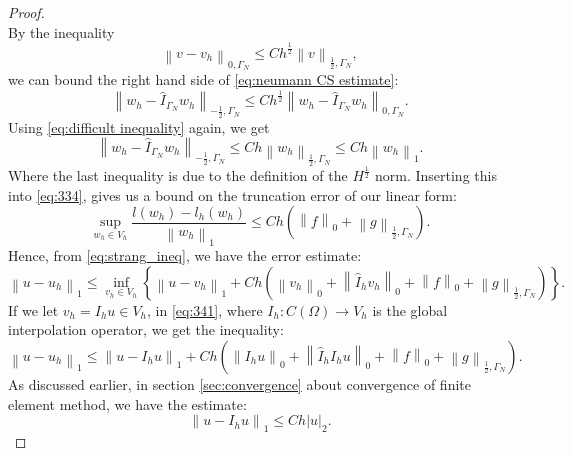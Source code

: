 \documentclass[../Main/main.tex]{subfiles}
\begin{document}
\begin{proof}
\begin{equation}
		\end{equation}
		By the inequality
		\begin{equation}\label{eq:difficult inequality}
			\left \| v-v_h\right \|_{0,\Gamma_N} \leq C h^{\frac{1}{2}} \left \| v \right \|_{\frac{1}{2}, \Gamma_N},
		\end{equation}
		we can bound the right hand side of  \eqref{eq:neumann CS estimate}: 
		\begin{equation}
				\left \|w_h-\hat{I}_{\Gamma_N} w_h\right \|_{-\frac{1}{2},\Gamma_N} \leq Ch^{\frac{1}{2}} \left \| w_h-\hat{I}_{\Gamma_N} w_h \right \|_{0,\Gamma_N}.
		\end{equation}
		Using \eqref{eq:difficult inequality} again, we get
		\begin{equation}
				\left \|w_h-\hat{I}_{\Gamma_N} w_h\right \|_{-\frac{1}{2},\Gamma_N} \leq Ch \left \|w_h\right \|_{\frac{1}{2},\Gamma_N} \leq Ch\left \| w_h \right \|_1.
		\end{equation}
		Where the last inequality is due to the definition of the $H^{\frac{1}{2}}$ norm. Inserting this into \eqref{eq:334}, gives us a bound on the truncation error of our linear form:
		\begin{equation}
			\sup_{w_h \in V_h} \frac{l(w_h)-l_h(w_h)}{\left \| w_h \right \|_1} \leq Ch(\left \|f \right \|_0 + \left \| g \right \|_{\frac{1}{2},\Gamma_N}).
		\end{equation}
		Hence, from \eqref{eq:strang_ineq}, we have the error estimate:
		\begin{equation}\label{eq:341}
					\left \| u - u_h \right \|_1 \leq \inf_{v_h \in V_h}\left \{ \left \| u - v_h \right \|_1 + Ch \left (\left \| v_h\right \|_0 + \left \| \hat{I}_h v_h \right \|_0 + \left \| f \right \|_0 + \left \| g \right \|_{\frac{1}{2},\Gamma_N}\right ) \right \}.
		\end{equation}
	If we let $v_h = I_h u \in V_h$, in \eqref{eq:341}, where $I_h:C(\Omega) \rightarrow V_h$ is the global interpolation operator, we get the inequality:
	\begin{equation}\label{eq:342}
	\left \| u - u_h \right \|_1 \leq \left \| u - I_h u \right \|_1 + Ch \left (\left \| I_h u\right \|_0 + \left \| \hat{I}_h I_h u \right \|_0 + \left \| f \right \|_0 + \left \| g \right \|_{\frac{1}{2},\Gamma_N} \right ).
	\end{equation}
	As discussed earlier, in section \ref{sec:convergence} about convergence of finite element method, we have the estimate:
	\begin{equation}
 \left \| u - I_h u \right \|_1 \leq C h|u|_2.

\end{equation}
\end{proof}
\end{document}
